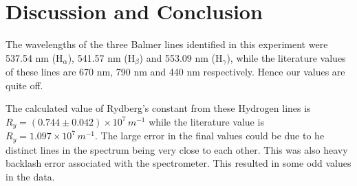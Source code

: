 \section{Discussion and Conclusion}
The wavelengths of the three Balmer lines identified in this experiment were 537.54 nm (H$_\alpha$), 541.57 nm (H$_\beta$) and 553.09 nm (H$_\gamma$), while the literature values of these lines are 670 nm, 790 nm and 440 nm respectively. Hence our values are quite off.

The calculated value of Rydberg's constant from these Hydrogen lines is $R_y=(0.744 \pm 0.042) \times 10^{7}\,m^{-1}$ while the literature value is $R_y= 1.097 \times 10^{7}\,m^{-1}$. The large error in the final values could be due to he distinct lines in the spectrum being very close to each other. This was also heavy backlash error associated with the spectrometer. This resulted in some odd values in the data.




